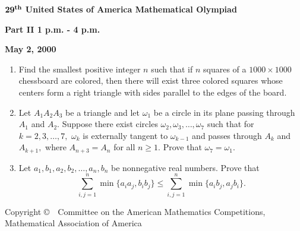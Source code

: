 \documentclass[12pt]{article}
\def\be{\begin{enumerate}}
\def\ee{\end{enumerate}}
\def\ii{\item}
\begin{document}
\begin{center}
${\bf 29^{th}}$ {\bf United States of America Mathematical Olympiad}
\end{center}



\begin{center}
{\bf  Part  II \hspace{ 6mm} 1 p.m. - 4 p.m.}
\end{center}


\begin{center}
{\bf May 2, 2000}
\end{center}

\bigskip

\be
\ii[4.] %
Find the smallest positive integer $n$ such that if $n$ squares of a $1000 \times 1000$ chessboard are
colored, then there will exist three colored squares whose centers form a right triangle with sides
parallel to the edges of the board.
\vspace{5mm}

\ii[5.] %
Let $A_1A_2A_3$ be a triangle and let $\omega_1$ be a circle in its plane passing through $A_1$ and
$A_2.$ Suppose there exist circles $\omega_2, \omega_3, \dots, \omega_7$ such that for $k = 2, 3, \dots,
7,$ $\omega_k$ is externally tangent to $\omega_{k-1}$ and passes through $A_k$ and $A_{k+1},$  where
$A_{n+3} = A_{n}$ for all $n \ge 1$. Prove that $\omega_7 = \omega_1.$
\vspace{5mm}

\ii[6.] %
Let $a_1, b_1, a_2, b_2, \dots , a_n, b_n$ be nonnegative real numbers. Prove that
\[
\sum_{i, j = 1}^{n} \min\{a_ia_j, b_ib_j\} \le \sum_{i, j = 1}^{n} \min\{a_ib_j, a_jb_i\}.
\] 

\ee

\vspace{120mm}
{\small
\begin{center}
Copyright \copyright \ \  Committee on the American  Mathematics  Competitions,\\
Mathematical Association of America
\end{center}
}
\end{document}
